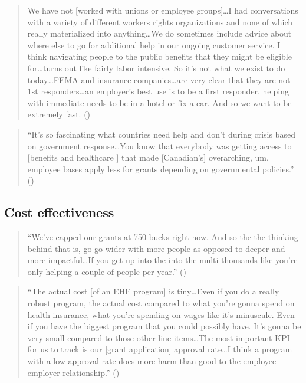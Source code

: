 \documentclass[
  11pt,
  oneside]{article}
\begin{document}
\begin{quote}
We have not {[}worked with unions or employee groups{]}\ldots I had conversations with a variety of different workers rights organizations and none of which really materialized into anything\ldots We do sometimes include advice about where else to go for additional help in our ongoing customer service. I think navigating people to the public benefits that they might be eligible for\ldots turns out like fairly labor intensive. So it's not what we exist to do today\ldots FEMA and insurance companies\ldots are very clear that they are not 1st responders\ldots an employer's best use is to be a first responder, helping with immediate needs to be in a hotel or fix a car. And so we want to be extremely fast. ()
\end{quote}

\begin{quote}
``It's so fascinating what countries need help and don't during crisis based on government response\ldots You know that everybody was getting access to {[}benefits and healthcare {]} that made {[}Canadian's{]} overarching, um, employee bases apply less for grants depending on governmental policies.'' ()
\end{quote}

\subsection{Cost effectiveness}\label{cost-effectiveness-1}

\begin{quote}
``We've capped our grants at 750 bucks right now. And so the the thinking behind that is, go go wider with more people as opposed to deeper and more impactful\ldots If you get up into the into the multi thousands like you're only helping a couple of people per year.'' ()
\end{quote}

\begin{quote}
``The actual cost {[}of an EHF program{]} is tiny\ldots Even if you do a really robust program, the actual cost compared to what you're gonna spend on health insurance, what you're spending on wages like it's minuscule. Even if you have the biggest program that you could possibly have. It's gonna be very small compared to those other line items\ldots The most important KPI for us to track is our {[}grant application{]} approval rate\ldots I think a program with a low approval rate does more harm than good to the employee-employer relationship.'' ()
\end{quote}
\end{document}
